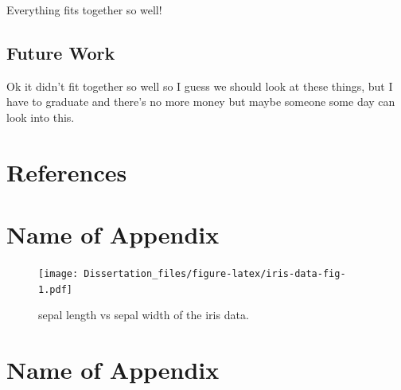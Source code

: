 \documentclass[
  10pt,
]{report}
\newlength{\cslhangindent}
\newlength{\cslentryspacingunit} %
\newenvironment{CSLReferences}[2] %
 {%
  \setlength{\parindent}{0pt}
  \ifodd #1
  \let\oldpar\par
  \def\par{\hangindent=\cslhangindent\oldpar}
  \fi
  \setlength{\parskip}{#2\cslentryspacingunit}
 }%
 {}
\begin{document}
Everything fits together so well!

\hypertarget{future-work}{%
\section{Future Work}\label{future-work}}

Ok it didn't fit together so well so I guess we should look at these things, but I have to graduate and there's no more money but maybe someone some day can look into this.

\hypertarget{references}{%
\chapter*{References}\label{references}}

\hypertarget{refs}{}
\begin{CSLReferences}{0}{0}
\end{CSLReferences}

\hypertarget{appendix-appendix}{%
\appendix}


\hypertarget{name-of-appendix}{%
\chapter{Name of Appendix}\label{name-of-appendix}}

\begin{figure}
\centering
\texttt{[image: Dissertation\_files/figure-latex/iris-data-fig-1.pdf]}
\caption{\label{fig:iris-data-fig}sepal length vs sepal width of the iris data.}
\end{figure}

\hypertarget{name-of-appendix-1}{%
\chapter{Name of Appendix}\label{name-of-appendix-1}}
\end{document}
